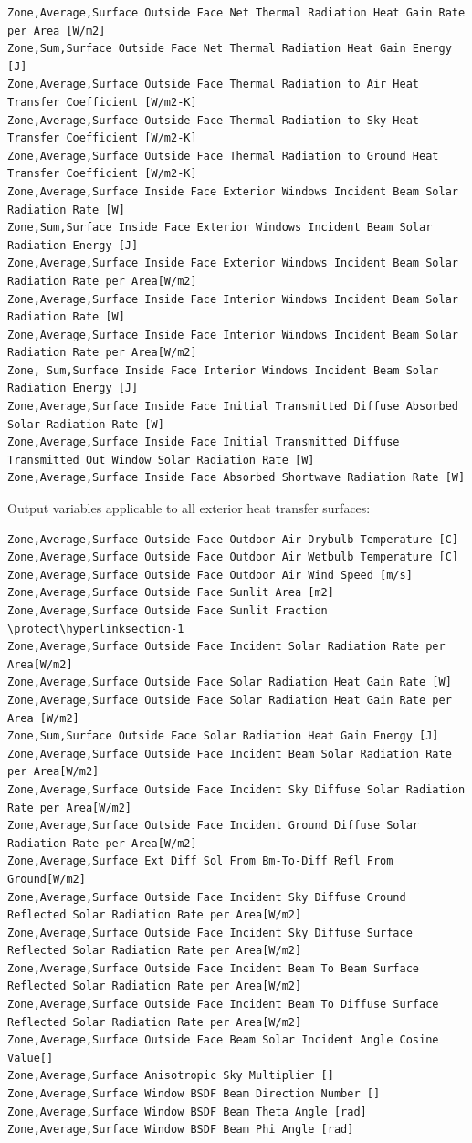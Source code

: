 \begin{lstlisting}
Zone,Average,Surface Outside Face Net Thermal Radiation Heat Gain Rate per Area [W/m2]
Zone,Sum,Surface Outside Face Net Thermal Radiation Heat Gain Energy [J]
Zone,Average,Surface Outside Face Thermal Radiation to Air Heat Transfer Coefficient [W/m2-K]
Zone,Average,Surface Outside Face Thermal Radiation to Sky Heat Transfer Coefficient [W/m2-K]
Zone,Average,Surface Outside Face Thermal Radiation to Ground Heat Transfer Coefficient [W/m2-K]
Zone,Average,Surface Inside Face Exterior Windows Incident Beam Solar Radiation Rate [W]
Zone,Sum,Surface Inside Face Exterior Windows Incident Beam Solar Radiation Energy [J]
Zone,Average,Surface Inside Face Exterior Windows Incident Beam Solar Radiation Rate per Area[W/m2]
Zone,Average,Surface Inside Face Interior Windows Incident Beam Solar Radiation Rate [W]
Zone,Average,Surface Inside Face Interior Windows Incident Beam Solar Radiation Rate per Area[W/m2]
Zone, Sum,Surface Inside Face Interior Windows Incident Beam Solar Radiation Energy [J]
Zone,Average,Surface Inside Face Initial Transmitted Diffuse Absorbed Solar Radiation Rate [W]
Zone,Average,Surface Inside Face Initial Transmitted Diffuse Transmitted Out Window Solar Radiation Rate [W]
Zone,Average,Surface Inside Face Absorbed Shortwave Radiation Rate [W]
\end{lstlisting}

Output variables applicable to all exterior heat transfer surfaces:

\begin{lstlisting}
Zone,Average,Surface Outside Face Outdoor Air Drybulb Temperature [C]
Zone,Average,Surface Outside Face Outdoor Air Wetbulb Temperature [C]
Zone,Average,Surface Outside Face Outdoor Air Wind Speed [m/s]
Zone,Average,Surface Outside Face Sunlit Area [m2]
Zone,Average,Surface Outside Face Sunlit Fraction \protect\hyperlinksection-1
Zone,Average,Surface Outside Face Incident Solar Radiation Rate per Area[W/m2]
Zone,Average,Surface Outside Face Solar Radiation Heat Gain Rate [W]
Zone,Average,Surface Outside Face Solar Radiation Heat Gain Rate per Area [W/m2]
Zone,Sum,Surface Outside Face Solar Radiation Heat Gain Energy [J]
Zone,Average,Surface Outside Face Incident Beam Solar Radiation Rate per Area[W/m2]
Zone,Average,Surface Outside Face Incident Sky Diffuse Solar Radiation Rate per Area[W/m2]
Zone,Average,Surface Outside Face Incident Ground Diffuse Solar Radiation Rate per Area[W/m2]
Zone,Average,Surface Ext Diff Sol From Bm-To-Diff Refl From Ground[W/m2]
Zone,Average,Surface Outside Face Incident Sky Diffuse Ground Reflected Solar Radiation Rate per Area[W/m2]
Zone,Average,Surface Outside Face Incident Sky Diffuse Surface Reflected Solar Radiation Rate per Area[W/m2]
Zone,Average,Surface Outside Face Incident Beam To Beam Surface Reflected Solar Radiation Rate per Area[W/m2]
Zone,Average,Surface Outside Face Incident Beam To Diffuse Surface Reflected Solar Radiation Rate per Area[W/m2]
Zone,Average,Surface Outside Face Beam Solar Incident Angle Cosine Value[]
Zone,Average,Surface Anisotropic Sky Multiplier []
Zone,Average,Surface Window BSDF Beam Direction Number []
Zone,Average,Surface Window BSDF Beam Theta Angle [rad]
Zone,Average,Surface Window BSDF Beam Phi Angle [rad]
\end{lstlisting}

